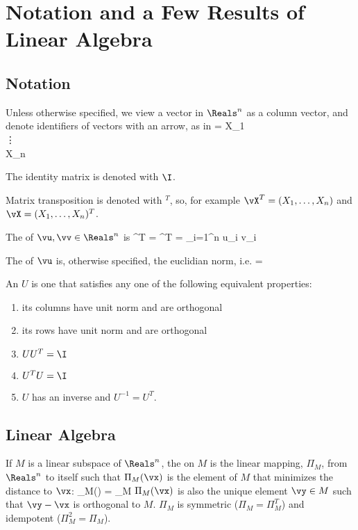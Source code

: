 
\minitoc
\section{Notation and a Few Results of Linear Algebra}
\subsection{Notation}Unless otherwise specified, we view a vector
in $\Reals^n$ as a column vector, and denote
identifiers of vectors with an arrow, as in
\ben \vX = X_1\\
\vdots\\X_n\emat\een

The identity matrix is denoted with $\I$.

Matrix transposition is denoted with $ ^T$, so, for example
 $\vX^T=(X_1, \ldots,X_n)$ and $\vX=(X_1, \ldots,X_n)^T$.

 The  of $\vu,\vv \in\Reals^n$ is \ben\vu^T \vv = \vv^T \vu =
 \sum_{i=1}^n u_i v_i\een

 The  of $\vu$ is, otherwise specified, the euclidian norm,
 i.e.
 \ben\norm{\vu}= 
 \een

An  $U$ is one that satisfies
any one of the following equivalent properties:
\begin{enumerate}
\item its columns have unit norm and are
orthogonal \item its rows have unit norm and are
orthogonal \item $U U^T = \I$ \item $U^T U = \I$ \item
$U$ has an inverse and $U^{-1}= U^T$.
\end{enumerate}
\subsection{Linear Algebra} If $M$ is a linear subspace
of $\Reals^n$, the  on $M$
is the linear mapping, $\Pi_M$, from $\Reals^n$ to
itself such that $\Pi_M(\vx)$ is the element of $M$
that minimizes the distance to $\vx$:
 \be
 \Pi_M(\vx) = \arg\min_{\vy \in M}\norm{\vy -\vx}
 \label{eq-def-proj-o}
 \ee
$\Pi_M(\vx)$ is also the unique element $\vy \in M$
such that $\vy-\vx$ is orthogonal to $M$. $\Pi_M $ is
symmetric ($\Pi_M =\Pi_M^T$) and idempotent ($\Pi_M^2
=\Pi_M$).


